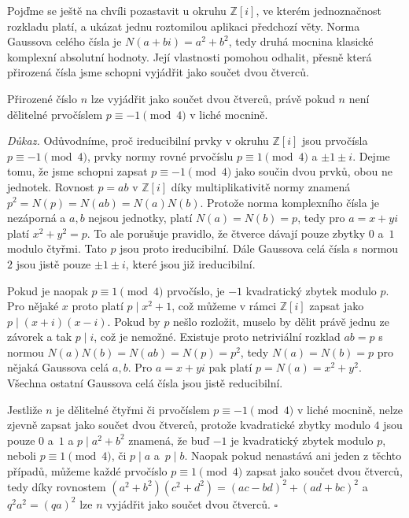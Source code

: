 \documentclass[12pt]{report}
\begin{document}
Pojďme se ještě na chvíli pozastavit u okruhu $\mathbb{Z}[i]$, ve kterém jednoznačnost rozkladu platí, a ukázat jednu roztomilou aplikaci předchozí věty. Norma Gaussova celého čísla je $N(a+bi) = a^2+b^2$, tedy druhá mocnina klasické komplexní absolutní hodnoty. Její vlastnosti pomohou odhalit, přesně která přirozená čísla jsme schopni vyjádřit jako součet dvou čtverců.


\begin{veta} 
Přirozené číslo $n$ lze vyjádřit jako součet dvou čtverců, právě pokud $n$ není dělitelné prvočíslem $p \equiv -1 \pmod{4}$ v liché mocnině.
\end{veta}

\noindent \textit{Důkaz.} Odůvodníme, proč ireducibilní prvky v okruhu $\mathbb{Z}[i]$ jsou prvočísla $p \equiv -1 \pmod{4}$, prvky normy rovné prvočíslu $p \equiv 1 \pmod{4}$ a $\pm 1 \pm i$. Dejme tomu, že jsme schopni zapsat $p \equiv -1 \pmod{4}$ jako součin dvou prvků, obou ne jednotek. Rovnost $p = ab$ v $\mathbb{Z}[i]$ díky multiplikativitě normy znamená $p^2 = N(p)=N(ab)=N(a)N(b)$. Protože norma komplexního čísla je nezáporná a $a,b$ nejsou jednotky, platí $N(a)=N(b)=p$, tedy pro $a=x+yi$ platí $x^2+y^2 = p$. To ale porušuje pravidlo, že čtverce dávají pouze zbytky $0$ a~$1$ modulo čtyřmi. Tato $p$ jsou proto ireducibilní. Dále Gaussova celá čísla s normou $2$ jsou jistě pouze $\pm 1 \pm i$, které jsou již ireducibilní.

Pokud je naopak $p \equiv 1 \pmod{4}$ prvočíslo, je $-1$ kvadratický zbytek modulo $p$. Pro nějaké $x$ proto platí $p \mid x^2+1$, což můžeme v rámci $\mathbb{Z}[i]$ zapsat jako $p \mid (x+i)(x-i)$. Pokud by $p$ nešlo rozložit, muselo by dělit právě jednu ze závorek a tak $p \mid i$, což je nemožné. Existuje proto netriviální rozklad $ab = p$ s normou $N(a)N(b) = N(ab) = N(p)=p^2$, tedy $N(a)=N(b)=p$ pro nějaká Gaussova celá $a,b$. Pro $a = x+yi$ pak platí $p = N(a) = x^2+y^2$. Všechna ostatní Gaussova celá čísla jsou jistě reducibilní.

Jestliže $n$ je dělitelné čtyřmi či prvočíslem $p \equiv -1 \pmod{4}$ v liché mocnině, nelze zjevně zapsat jako součet dvou čtverců, protože kvadratické zbytky modulo $4$ jsou pouze $0$ a~$1$ a $p \mid a^2+b^2$ znamená, že buď $-1$ je kvadratický zbytek modulo $p$, neboli $p \equiv 1 \pmod{4}$, či $p \mid a$ a~$p \mid b$. Naopak pokud nenastává ani jeden z těchto případů, můžeme každé prvočíslo $p \equiv 1 \pmod{4}$ zapsat jako součet dvou čtverců, tedy díky rovnostem $(a^2+b^2)(c^2+d^2) = (ac-bd)^2+(ad+bc)^2$ a $q^2 a^2 = (qa)^2$ lze $n$ vyjádřit jako součet dvou čtverců. \hfill $\square$\\
\end{document}
